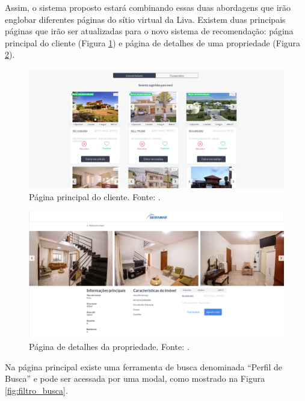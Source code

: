 Assim, o sistema proposto estará combinando essas duas abordagens que irão englobar diferentes páginas do sítio virtual da Liva. Existem duas principais páginas que irão ser atualizadas para o novo sistema de recomendação: página principal do cliente (Figura \ref{fig:pagina_principal}) e página de detalhes de uma propriedade (Figura \ref{fig:pagina_detalhes}).

\begin{figure}[H]
    \centering
    \includegraphics[scale=0.33]{figuras/proposta/pagina_principal.png}
    \caption[Página principal do cliente]{Página principal do cliente. Fonte:  \cite{Liva:2019}.}
    \label{fig:pagina_principal}
\end{figure}

\begin{figure}[H]
    \centering
    \includegraphics[scale=0.23]{figuras/proposta/pagina_detalhes.png}
    \caption[Página de detalhes da propriedade]{Página de detalhes da propriedade. Fonte: \cite{Liva:2019}.}
    \label{fig:pagina_detalhes}
\end{figure}

Na página principal existe uma ferramenta de busca denominada “Perfil de Busca” e pode ser acessada por uma modal, como mostrado na Figura \ref{fig:filtro_busca}.

